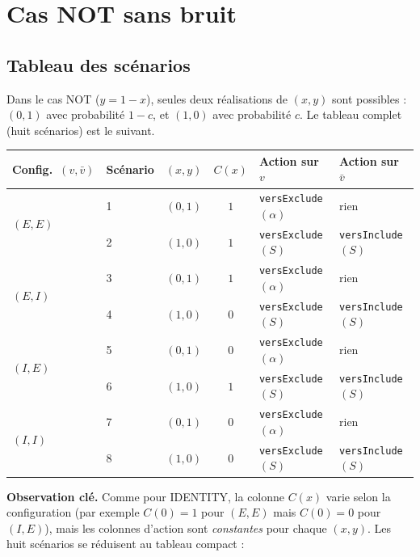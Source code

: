 \documentclass[12pt,a4paper]{article}
\theoremstyle{remark}
\newcommand{\vbar}{\bar{v}}
\begin{document}
\section{Cas NOT sans bruit}

\subsection{Tableau des scénarios}

Dans le cas NOT ($y = 1-x$), seules deux réalisations de $(x,y)$ sont possibles :
$(0,1)$ avec probabilité $1-c$, et $(1,0)$ avec probabilité $c$.
Le tableau complet (huit scénarios) est le suivant.

\begin{center}
\renewcommand{\arraystretch}{1.35}
\begin{tabular}{llccll}
\toprule
Config.\ $(v,\vbar)$ & Scénario & $(x,y)$ & $C(x)$ & Action sur $v$ & Action sur $\vbar$ \\
\midrule
\multirow{2}{*}{$(E,E)$}
  & 1 & $(0,1)$ & $1$ & \texttt{versExclude}$(\alpha)$ & rien \\
  & 2 & $(1,0)$ & $1$ & \texttt{versExclude}$(S)$ & \texttt{versInclude}$(S)$ \\
\midrule
\multirow{2}{*}{$(E,I)$}
  & 3 & $(0,1)$ & $1$ & \texttt{versExclude}$(\alpha)$ & rien \\
  & 4 & $(1,0)$ & $0$ & \texttt{versExclude}$(S)$ & \texttt{versInclude}$(S)$ \\
\midrule
\multirow{2}{*}{$(I,E)$}
  & 5 & $(0,1)$ & $0$ & \texttt{versExclude}$(\alpha)$ & rien \\
  & 6 & $(1,0)$ & $1$ & \texttt{versExclude}$(S)$ & \texttt{versInclude}$(S)$ \\
\midrule
\multirow{2}{*}{$(I,I)$}
  & 7 & $(0,1)$ & $0$ & \texttt{versExclude}$(\alpha)$ & rien \\
  & 8 & $(1,0)$ & $0$ & \texttt{versExclude}$(S)$ & \texttt{versInclude}$(S)$ \\
\bottomrule
\end{tabular}
\end{center}

\medskip
\noindent
\textbf{Observation clé.}  Comme pour IDENTITY, la colonne $C(x)$ varie selon
la configuration (par exemple $C(0)=1$ pour $(E,E)$ mais $C(0)=0$ pour $(I,E)$),
mais les colonnes d'action sont \emph{constantes} pour chaque $(x,y)$.
Les huit scénarios se réduisent au tableau compact :
\end{document}
